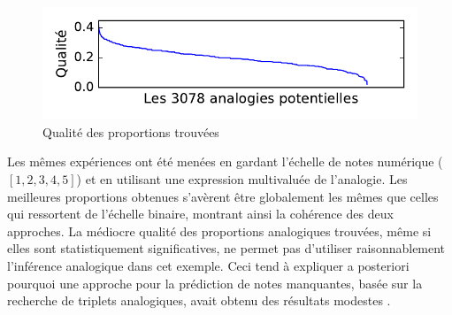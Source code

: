 \begin{figure}[h]
  \vspace{-0.4cm}
\caption{Qualité des proportions trouvées}
\label{qualite}
\includegraphics[scale=0.6]{figures/quality_of_proportions.pdf}
\vspace{-0.4cm}
\end{figure}
Les mêmes expériences ont été menées en gardant l'échelle de notes numérique
($[1, 2, 3, 4, 5]$) et en utilisant une expression multivaluée de l'analogie.
Les meilleures proportions obtenues s'avèrent être globalement les mêmes que
celles qui ressortent de l'échelle binaire, montrant ainsi la cohérence des
deux approches. La m\'ediocre qualit\'e des proportions analogiques trouv\'ees, 
m\^eme si elles sont statistiquement significatives, 
ne permet pas d'utiliser raisonnablement l'inf\'erence analogique dans cet exemple. 
Ceci  tend \`a expliquer a posteriori pourquoi une approche pour la
pr\'ediction de notes manquantes, bas\'ee sur la recherche de triplets
analogiques, avait obtenu des r\'esultats modestes \cite{HugPraRicISMIS15}.
